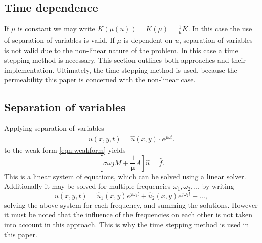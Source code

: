 \subsection{Time dependence}
If $\mu$ is constant we may write $K(\mu(u)) = K(\mu) = \frac{1}{\mu}K$. In this case the use of separation of variables is valid. 
If $\mu$ is dependent on $u$, separation of variables is not valid due to the non-linear nature of the problem. 
In this case a time stepping method is necessary. This section outlines both approaches and their implementation.
Ultimately, the time stepping method is used, because the permeability this paper is concerned with the non-linear case.

\subsection{Separation of variables}
Applying separation of variables
\begin{align*}
    u(x,y,t) = \hat u(x,y) \cdot e^{j\omega t}.
\end{align*}
to the weak form \eqref{eqn:weakform} yields
\begin{equation*}
    \left[\sigma \omega j M + \frac{1}{\mathbf \mu}A\right]\hat u = \hat f.
\end{equation*}
This is a linear system of equations, which can be solved using a linear solver. 
Additionally it may be solved for multiple frequencies $\omega_1, \omega_2, \dots$ by writing
\begin{equation}
    u(x,y,t) = \hat u_1(x,y) e^{j\omega_1 t} + \hat u_2(x,y) e^{j\omega_2 t} + \dots,
\end{equation}
solving the above system for each frequency, and summing the solutions. However it must be noted that the influence of the frequencies on each other is not taken into account in this approach.
This is why the time stepping method is used in this paper.

